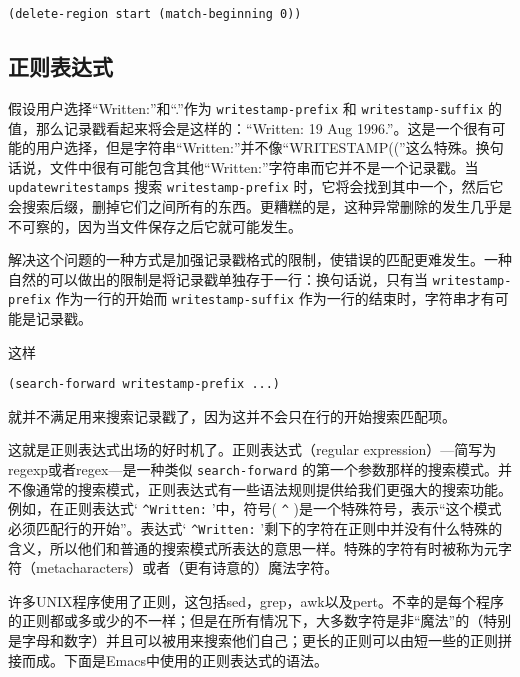 \begin{verbatim}
(delete-region start (match-beginning 0))
\end{verbatim}

\subsection{正则表达式}
\label{section:04-Regular-Expressions}

假设用户选择“Written:”和“.”作为 \texttt{writestamp-prefix} 和 \texttt{writestamp-suffix} 的值，那么记录戳看起来将会是这样的：“Written: 19 Aug 1996.”。这是一个很有可能的用户选择，但是字符串“Written:”并不像“WRITESTAMP((”这么特殊。换句话说，文件中很有可能包含其他“Written:”字符串而它并不是一个记录戳。当 \texttt{updatewritestamps} 搜索 \texttt{writestamp-prefix} 时，它将会找到其中一个，然后它会搜索后缀，删掉它们之间所有的东西。更糟糕的是，这种异常删除的发生几乎是不可察的，因为当文件保存之后它就可能发生。

解决这个问题的一种方式是加强记录戳格式的限制，使错误的匹配更难发生。一种自然的可以做出的限制是将记录戳单独存于一行：换句话说，只有当 \texttt{writestamp-prefix} 作为一行的开始而 \texttt{writestamp-suffix} 作为一行的结束时，字符串才有可能是记录戳。

这样

\begin{verbatim}
(search-forward writestamp-prefix ...)
\end{verbatim}

就并不满足用来搜索记录戳了，因为这并不会只在行的开始搜索匹配项。

这就是正则表达式出场的好时机了。正则表达式（regular expression）---简写为regexp或者regex---是一种类似 \texttt{search-forward} 的第一个参数那样的搜索模式。并不像通常的搜索模式，正则表达式有一些语法规则提供给我们更强大的搜索功能。例如，在正则表达式‘ \verb|^Written:| ’中，符号( \verb|^| )是一个特殊符号，表示“这个模式必须匹配行的开始”。表达式‘ \verb|^Written:| ’剩下的字符在正则中并没有什么特殊的含义，所以他们和普通的搜索模式所表达的意思一样。特殊的字符有时被称为元字符（metacharacters）或者（更有诗意的）魔法字符。

许多UNIX程序使用了正则，这包括sed，grep，awk以及pert。不幸的是每个程序的正则都或多或少的不一样；但是在所有情况下，大多数字符是非“魔法”的（特别是字母和数字）并且可以被用来搜索他们自己；更长的正则可以由短一些的正则拼接而成。下面是Emacs中使用的正则表达式的语法。

